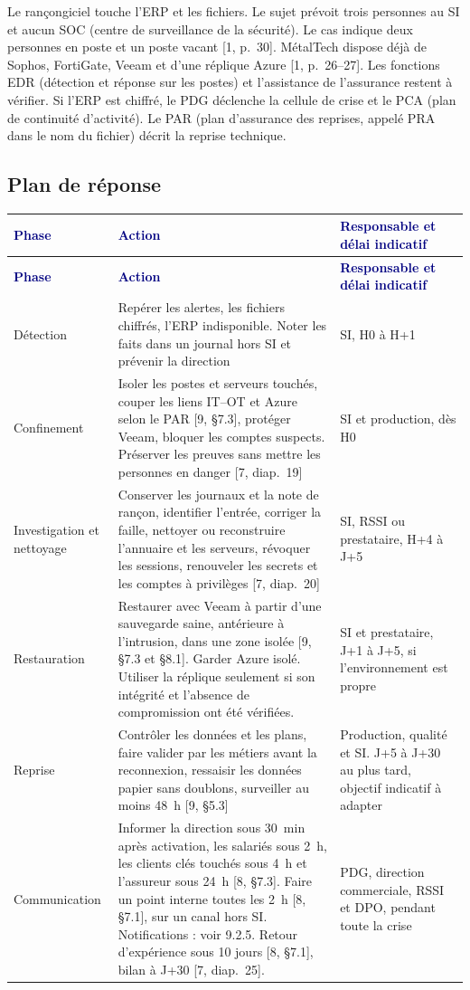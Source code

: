 \documentclass[11pt,a4paper]{article}
\newcommand{\thd}[1]{\textbf{\textcolor{navy}{#1}}}
\begin{document}
Le rançongiciel touche l'ERP et les fichiers. Le sujet prévoit trois personnes au SI et aucun SOC (centre de surveillance de la sécurité). Le cas indique deux personnes en poste et un poste vacant [1, p.~30]. MétalTech dispose déjà de Sophos, FortiGate, Veeam et d'une réplique Azure [1, p.~26--27]. Les fonctions EDR (détection et réponse sur les postes) et l'assistance de l'assurance restent à vérifier. Si l'ERP est chiffré, le PDG déclenche la cellule de crise et le PCA (plan de continuité d'activité). Le PAR (plan d'assurance des reprises, appelé PRA dans le nom du fichier) décrit la reprise technique.

\subsection*{Plan de réponse}
\begin{xltabular}{\linewidth}{@{}P{25mm}YP{37mm}@{}}\toprule
\thd{Phase} & \thd{Action} & \thd{Responsable et délai indicatif}\\\midrule\endfirsthead
\toprule \thd{Phase} & \thd{Action} & \thd{Responsable et délai indicatif}\\\midrule\endhead
\bottomrule\endfoot
Détection & Repérer les alertes, les fichiers chiffrés, l'ERP indisponible. Noter les faits dans un journal hors SI et prévenir la direction & SI, H0 à H+1\\
Confinement & Isoler les postes et serveurs touchés, couper les liens IT--OT et Azure selon le PAR [9, §7.3], protéger Veeam, bloquer les comptes suspects. Préserver les preuves sans mettre les personnes en danger [7, diap.~19] & SI et production, dès H0\\
Investigation et nettoyage & Conserver les journaux et la note de rançon, identifier l'entrée, corriger la faille, nettoyer ou reconstruire l'annuaire et les serveurs, révoquer les sessions, renouveler les secrets et les comptes à privilèges [7, diap.~20] & SI, RSSI ou prestataire, H+4 à J+5\\
Restauration & Restaurer avec Veeam à partir d'une sauvegarde saine, antérieure à l'intrusion, dans une zone isolée [9, §7.3 et §8.1]. Garder Azure isolé. Utiliser la réplique seulement si son intégrité et l'absence de compromission ont été vérifiées. & SI et prestataire, J+1 à J+5, si l'environnement est propre\\
Reprise & Contrôler les données et les plans, faire valider par les métiers avant la reconnexion, ressaisir les données papier sans doublons, surveiller au moins 48~h [9, §5.3] & Production, qualité et SI. J+5 à J+30 au plus tard, objectif indicatif à adapter\\
Communication & Informer la direction sous 30~min après activation, les salariés sous 2~h, les clients clés touchés sous 4~h et l'assureur sous 24~h [8, §7.3]. Faire un point interne toutes les 2~h [8, §7.1], sur un canal hors SI. Notifications : voir 9.2.5. Retour d'expérience sous 10 jours [8, §7.1], bilan à J+30 [7, diap.~25]. & PDG, direction commerciale, RSSI et DPO, pendant toute la crise\\
\end{xltabular}
\end{document}
